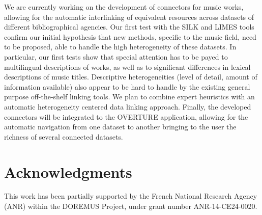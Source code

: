 \documentclass[runningheads,a4paper]{llncs}
\begin{document}
We are currently working on the development of connectors for music works, allowing for the automatic interlinking of equivalent resources across datasets of different bibliographical agencies. Our first test with the SILK \cite{} and LIMES \cite{} tools confirm our initial hypothesis that new methods, specific to the music field, need to be proposed, able to handle the high heterogeneity of these datasets. In particular, our first tests show that special attention has to be payed to multilingual descriptions of works, as well as to significant differences in lexical descriptions of music titles. Descriptive heterogeneities (level of detail, amount of information available) also appear to be hard to handle by the existing general purpose off-the-shelf linking tools. We plan to combine expert heuristics with an automatic heterogeneity centered data linking approach. Finally, the developed connectors will be integrated to the OVERTURE application, allowing for the automatic navigation from one dataset to another bringing to the user the richness of several connected datasets.

\section*{Acknowledgments}
This work has been partially supported by the French National Research Agency (ANR) within the DOREMUS Project, under grant number ANR-14-CE24-0020.



\end{document}
